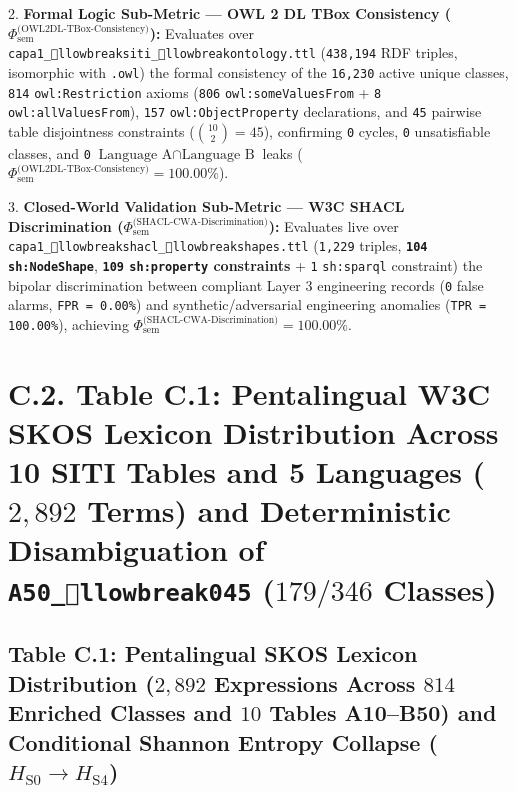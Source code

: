 \documentclass[10pt,a4paper]{article}
\begin{document}
2. \textbf{Formal Logic Sub-Metric --- OWL 2 DL TBox Consistency ($\Phi_{\text{sem}}^{\text{(OWL2DL-TBox-Consistency)}}$):} Evaluates over \texttt{capa1\_llowbreak{}siti\_llowbreak{}ontology.ttl} (\texttt{438,194} RDF triples, isomorphic with \texttt{.owl}) the formal consistency of the \texttt{16,230} active unique classes, \texttt{814} \texttt{owl:Restriction} axioms (\texttt{806} \texttt{owl:someValuesFrom} + \texttt{8} \texttt{owl:allValuesFrom}), \texttt{157} \texttt{owl:ObjectProperty} declarations, and \texttt{45} pairwise table disjointness constraints ($\binom{10}{2} = 45$), confirming \texttt{0} cycles, \texttt{0} unsatisfiable classes, and \texttt{0} $\text{Language A} \cap \text{Language B}$ leaks (\textbf{$\Phi_{\text{sem}}^{\text{(OWL2DL-TBox-Consistency)}} = 100.00\%$}).\par

3. \textbf{Closed-World Validation Sub-Metric --- W3C SHACL Discrimination ($\Phi_{\text{sem}}^{\text{(SHACL-CWA-Discrimination)}}$):} Evaluates live over \texttt{capa1\_llowbreak{}shacl\_llowbreak{}shapes.ttl} (\texttt{1,229} triples, \textbf{\texttt{104} \texttt{sh:NodeShape}}, \textbf{\texttt{109} \texttt{sh:property} constraints} + \texttt{1} \texttt{sh:sparql} constraint) the bipolar discrimination between compliant Layer 3 engineering records (\texttt{0} false alarms, \texttt{FPR = 0.00\%}) and synthetic/adversarial engineering anomalies (\texttt{TPR = 100.00\%}), achieving \textbf{$\Phi_{\text{sem}}^{\text{(SHACL-CWA-Discrimination)}} = 100.00\%$}.\par



\section*{C.2. Table C.1: Pentalingual W3C SKOS Lexicon Distribution Across 10 SITI Tables and 5 Languages ($2,892$ Terms) and Deterministic Disambiguation of \texttt{A50\_llowbreak{}045} ($179/346$ Classes)}

\subsection*{Table C.1: Pentalingual SKOS Lexicon Distribution ($2,892$ Expressions Across $814$ Enriched Classes and $10$ Tables A10--B50) and Conditional Shannon Entropy Collapse ($H_{\text{S0}} \to H_{\text{S4}}$)}
\end{document}
